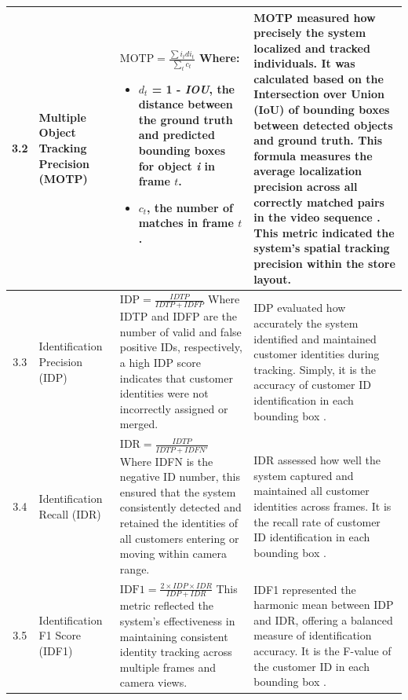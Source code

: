 {\begin{longtable}[H]{|c|>{\centering\arraybackslash}m{2.2cm}|>{\centering\arraybackslash}m{6.2cm}|>{\centering\arraybackslash}m{3.8cm}|}
	3.2 
	& Multiple Object Tracking Precision (MOTP) 
	& 
	$
	\text{MOTP} = \frac{\sum{i_t}d{i_t}}{\sum_{t}c_t}
	$
	\newline
	\newline
	Where:
	\begin{itemize}
		\item $d_t$ = 1 - \textit{IOU}, the distance between the ground truth and predicted bounding boxes for object \textit{i} in frame $t$.
		\item $c_t$, the number of matches in frame $t$.
	\end{itemize}
	& MOTP measured how precisely the system localized and tracked individuals. It was calculated based on the Intersection over Union (IoU) of bounding boxes between detected objects and ground truth. This formula measures the average localization precision across all correctly matched pairs in the video sequence \citep{Fei2023}. This metric indicated the system’s spatial tracking precision within the store layout. \\
	\hline
	3.3 
	& Identification Precision (IDP) 
	& $\text{IDP} = \frac{IDTP}{IDTP + IDFP}$
	\newline
	\newline
	Where IDTP and IDFP are the number of valid and false positive IDs, respectively, a high IDP score indicates that customer identities were not incorrectly assigned or merged.
	& IDP evaluated how accurately the system identified and maintained customer identities during tracking. Simply, it is the accuracy of customer ID identification in each bounding box \citep{Fei2023}. \\
	\hline
	3.4 
	& Identification Recall (IDR) 
	& 
	$\text{IDR} = \frac{IDTP}{IDTP + IDFN'}$
	\newline
	\newline
	Where IDFN is the negative ID number, this ensured that the system consistently detected and retained the identities of all customers entering or moving within camera range.
	& IDR assessed how well the system captured and maintained all customer identities across frames. It is the recall rate of customer ID identification in each bounding box \citep{Fei2023}. \\
	\hline
	3.5 
	& Identification F1 Score (IDF1) 
	& 
	$
	\text{IDF1} = \frac{2 \times IDP \times IDR}{IDP + IDR}
	$
	\newline
	\newline
	This metric reflected the system's effectiveness in maintaining consistent identity tracking across multiple frames and camera views.
	& IDF1 represented the harmonic mean between IDP and IDR, offering a balanced measure of identification accuracy. It is the F-value of the customer ID in each bounding box \citep{Fei2023}.\\
\end{longtable}

}

